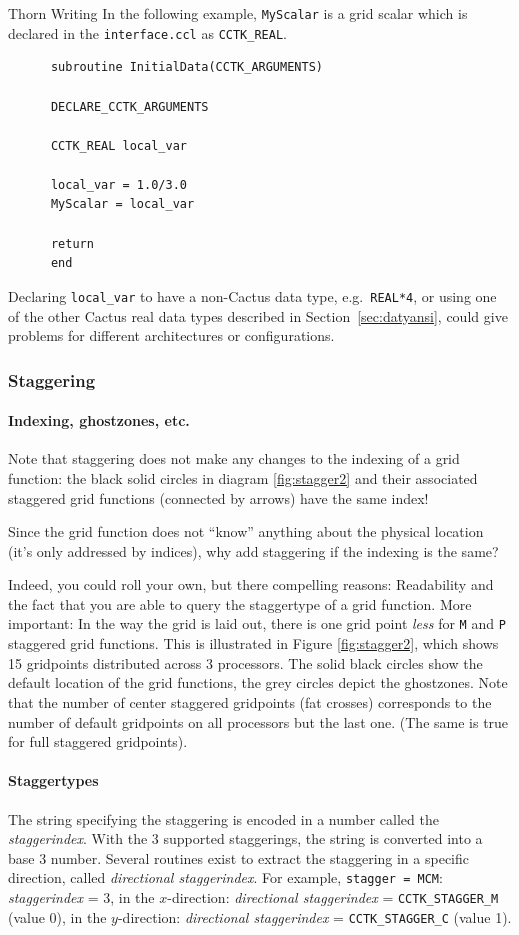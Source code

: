 \begin{cactuspart}{Thorn Writing}
In the following example, \verb|MyScalar| is a grid scalar which
is declared in the \texttt{interface.ccl} as \texttt{CCTK\_REAL}.
%
\begin{verbatim}
      subroutine InitialData(CCTK_ARGUMENTS)

      DECLARE_CCTK_ARGUMENTS

      CCTK_REAL local_var

      local_var = 1.0/3.0
      MyScalar = local_var

      return
      end
\end{verbatim}
%
Declaring \texttt{local\_var} to have a non-Cactus data type, e.g.\
\texttt{REAL*4}, or using one of the other Cactus real data types
described in Section~\ref{sec:datyansi}, could give problems for
different architectures or configurations.

\subsubsection{Staggering}
\label{sec:st}

\paragraph{Indexing, ghostzones, etc.}
Note that staggering does not make any changes to the indexing of a
grid function: the black solid circles in diagram \ref{fig:stagger2} and their
associated staggered grid functions (connected by arrows) have the same index!

Since the grid function does not ``know'' anything about the physical
location (it's only addressed by indices), why add staggering if the
indexing is the same?

Indeed, you could roll your own, but there compelling reasons:
Readability and the fact that you are able to query the staggertype of a
grid function. More important: In the way the grid is laid out, there is one grid
point \emph{less} for \texttt{M} and \texttt{P} staggered grid functions. This is
illustrated in Figure \ref{fig:stagger2}, which shows 15 gridpoints distributed
across 3 processors. The solid black circles show the default
location of the grid functions, the grey circles depict the ghostzones.
Note that the number of center staggered gridpoints (fat crosses)
corresponds to the number of default gridpoints on all processors but
the last one. (The same is true for full staggered gridpoints).

\paragraph{Staggertypes}
The string specifying the staggering is encoded in a number called
the \textit{staggerindex}. With the 3 supported staggerings, the string
is converted into a base 3 number. Several routines exist to extract the
staggering in a specific direction, called \textit{directional
staggerindex}. For example, \texttt{stagger = MCM}: \textit{staggerindex} = 3, in the
$x$-direction: \textit{directional staggerindex} = \texttt{CCTK\_STAGGER\_M} (value 0),
in the
$y$-direction: \textit{directional staggerindex} = \texttt{CCTK\_STAGGER\_C} (value 1).


\end{cactuspart}
